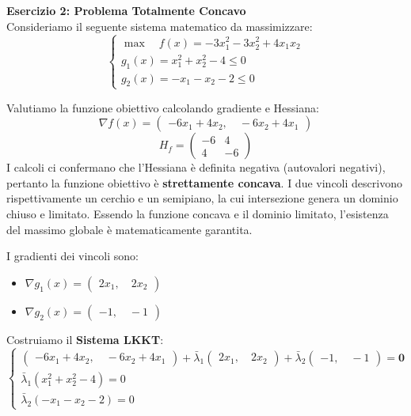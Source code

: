 \documentclass[12pt, a4paper]{article}
\newcommand{\separatore}{\noindent{\color{titlecolor!50}\rule{\textwidth}{0.6pt}}}
\begin{document}
	\vspace{0.6cm}
	\separatore
	\vspace{0.4cm}
	
	\textbf{Esercizio 2: Problema Totalmente Concavo}\\[0.2cm]
	Consideriamo il seguente sistema matematico da massimizzare:
	\[
	\begin{cases}
		\max \quad f(x) = -3x_1^2 - 3x_2^2 + 4x_1x_2 \\[6pt]
		g_1(x) = x_1^2 + x_2^2 - 4 \le 0 \\
		g_2(x) = -x_1 - x_2 - 2 \le 0
	\end{cases}
	\]
	
	Valutiamo la funzione obiettivo calcolando gradiente e Hessiana:
	\[
	\nabla f(x) = \begin{pmatrix} -6x_1 + 4x_2, \quad -6x_2 + 4x_1 \end{pmatrix}
	\]
	\[
	H_f = \begin{pmatrix} -6 & 4 \\ 4 & -6 \end{pmatrix}
	\]
	I calcoli ci confermano che l'Hessiana è definita negativa (autovalori negativi), pertanto la funzione obiettivo è \textbf{strettamente concava}. I due vincoli descrivono rispettivamente un cerchio e un semipiano, la cui intersezione genera un dominio chiuso e limitato. Essendo la funzione concava e il dominio limitato, l'esistenza del massimo globale è matematicamente garantita.
	
	I gradienti dei vincoli sono:
	\begin{itemize}
		\item $\nabla g_1(x) = \begin{pmatrix} 2x_1, \quad 2x_2 \end{pmatrix}$
		\item $\nabla g_2(x) = \begin{pmatrix} -1, \quad -1 \end{pmatrix}$
	\end{itemize}
	
	Costruiamo il \textbf{Sistema LKKT}:
	\[
	\begin{cases}
		\begin{pmatrix} -6x_1 + 4x_2, \quad -6x_2 + 4x_1 \end{pmatrix} + \bar{\lambda}_1 \begin{pmatrix} 2x_1, \quad 2x_2 \end{pmatrix} + \bar{\lambda}_2 \begin{pmatrix} -1, \quad -1 \end{pmatrix} = \mathbf{0} \\[6pt]
		\bar{\lambda}_1 (x_1^2 + x_2^2 - 4) = 0 \\
		\bar{\lambda}_2 (-x_1 - x_2 - 2) = 0
	\end{cases}
	\]
	
\end{document}

